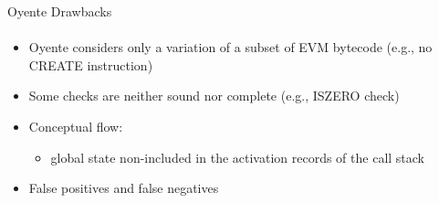 \begin{frame}{Oyente Drawbacks}
    \framesubtitle{\cite{grishchenko2018semantic,bib:securify}}
    \begin{itemize}
        \item Oyente considers only a variation of a subset of EVM bytecode (e.g., no CREATE instruction)
        \item Some checks are neither sound nor complete (e.g., ISZERO check)
        \item Conceptual flow: 
        \begin{itemize}
            \item global state non-included in the activation records of the call stack
        \end{itemize}
        \item False positives and false negatives
    \end{itemize}
\end{frame}
